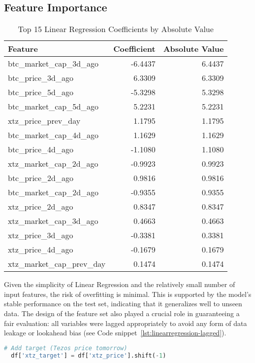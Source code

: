 \subsection{Feature Importance}
\begin{table}[H]
\centering
\caption{Top 15 Linear Regression Coefficients by Absolute Value}
\label{tab:linearregression-coefficients}
\begin{tabular}{lrr}
\toprule
\textbf{Feature} & \textbf{Coefficient} & \textbf{Absolute Value} \\
\midrule
btc\_market\_cap\_3d\_ago & -6.4437 & 6.4437 \\
btc\_price\_3d\_ago       & 6.3309  & 6.3309 \\
btc\_price\_5d\_ago       & -5.3298 & 5.3298 \\
btc\_market\_cap\_5d\_ago & 5.2231  & 5.2231 \\
xtz\_price\_prev\_day     & 1.1795  & 1.1795 \\
btc\_market\_cap\_4d\_ago & 1.1629  & 1.1629 \\
btc\_price\_4d\_ago       & -1.1080 & 1.1080 \\
xtz\_market\_cap\_2d\_ago & -0.9923 & 0.9923 \\
btc\_price\_2d\_ago       & 0.9816  & 0.9816 \\
btc\_market\_cap\_2d\_ago & -0.9355 & 0.9355 \\
xtz\_price\_2d\_ago       & 0.8347  & 0.8347 \\
xtz\_market\_cap\_3d\_ago & 0.4663  & 0.4663 \\
xtz\_price\_3d\_ago       & -0.3381 & 0.3381 \\
xtz\_price\_4d\_ago       & -0.1679 & 0.1679 \\
xtz\_market\_cap\_prev\_day & 0.1474 & 0.1474 \\
\bottomrule
\end{tabular}
\end{table}

Given the simplicity of Linear Regression and the relatively small number of input features, the risk of overfitting is minimal. 
This is supported by the model’s stable performance on the test set, indicating that it generalizes well to unseen data. 
The design of the feature set also played a crucial role in guaranteeing a fair evaluation: all variables were lagged appropriately to avoid any form of data leakage or lookahead bias (see Code snippet~\ref{lst:linearregression-lagged}).
\begin{lstlisting}[language=Python, caption={Lagged features}, label={lst:linearregression-lagged}]
  # Add target (Tezos price tomorrow)
  df['xtz_target'] = df['xtz_price'].shift(-1)
\end{lstlisting}

